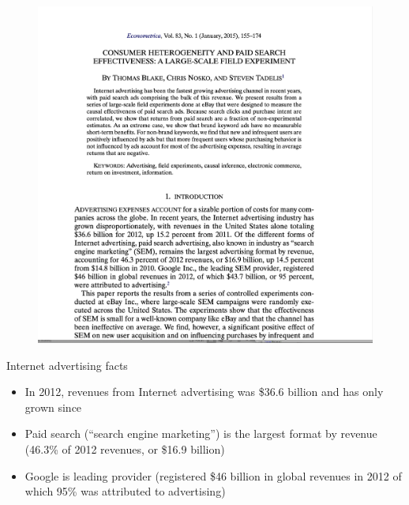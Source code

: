 \documentclass{beamer}
\begin{document}
\begin{frame}

\begin{figure}[hpt]
\begin{center}
\includegraphics[scale=0.25]{./lecture_includes/econometrica_steve.png}
\end{center}
\end{figure}

\end{frame}

\begin{frame}{Internet advertising facts}

\begin{itemize}
\item In 2012, revenues from Internet advertising was \$36.6 billion and has only grown since
\item Paid search (``search engine marketing'') is the largest format by revenue (46.3\% of 2012 revenues, or \$16.9 billion)
\item Google is leading provider (registered \$46 billion in global revenues in 2012 of which 95\% was attributed to advertising)
\end{itemize}

\end{frame}
\end{document}
